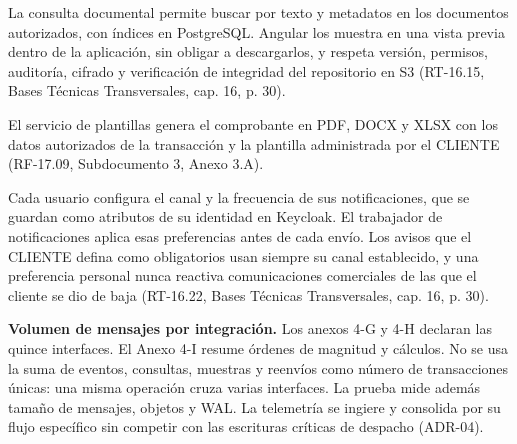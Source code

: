 La consulta documental permite buscar por texto y metadatos en los documentos autorizados, con índices en PostgreSQL. Angular los muestra en una vista previa dentro de la aplicación, sin obligar a descargarlos, y respeta versión, permisos, auditoría, cifrado y verificación de integridad del repositorio en S3 (RT-16.15, Bases Técnicas Transversales, cap. 16, p. 30).

El servicio de plantillas genera el comprobante en PDF, DOCX y XLSX con los datos autorizados de la transacción y la plantilla administrada por el CLIENTE (RF-17.09, Subdocumento 3, Anexo 3.A).

Cada usuario configura el canal y la frecuencia de sus notificaciones, que se guardan como atributos de su identidad en Keycloak. El trabajador de notificaciones aplica esas preferencias antes de cada envío. Los avisos que el CLIENTE defina como obligatorios usan siempre su canal establecido, y una preferencia personal nunca reactiva comunicaciones comerciales de las que el cliente se dio de baja (RT-16.22, Bases Técnicas Transversales, cap. 16, p. 30).

\textbf{Volumen de mensajes por integración.} Los anexos 4-G y 4-H declaran las quince interfaces. El Anexo 4-I resume órdenes de magnitud y cálculos. No se usa la suma de eventos, consultas, muestras y reenvíos como número de transacciones únicas: una misma operación cruza varias interfaces. La prueba mide además tamaño de mensajes, objetos y WAL. La telemetría se ingiere y consolida por su flujo específico sin competir con las escrituras críticas de despacho (ADR-04).

